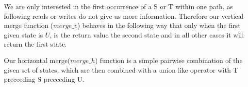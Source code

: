 We are only interested in the first occurrence of a S or T within one path, as following reads or writes do not give us more information. Therefore our vertical merge function ($merge\_v$) behaves in the following way that only when the first given state is $U$, is the return value the second state and in all other cases it will return the first state.
%


Our horizontal merge($merge\_h$) function is a simple pairwise combination of the given set of states, which are then combined with a union like operator with T preceeding S preceeding U.
%
%

